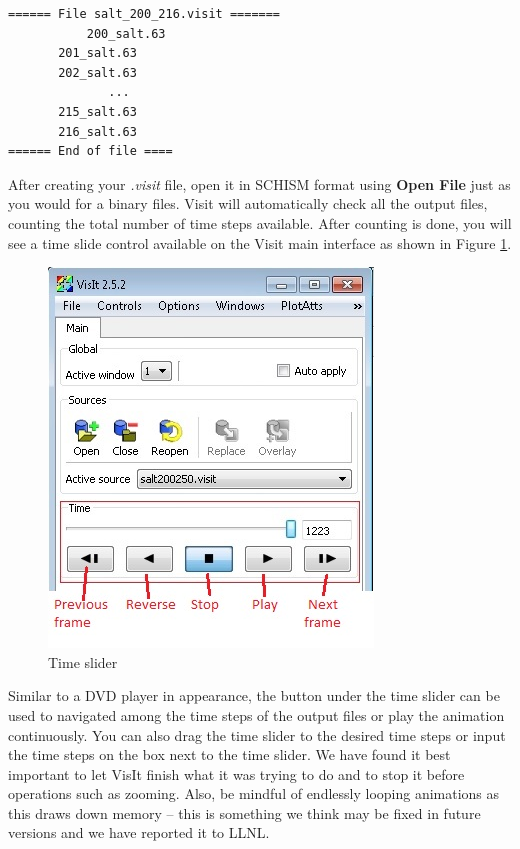 \documentclass[12pt]{report}
\begin{document}
\begin{verbatim}
====== File salt_200_216.visit =======
		   200_salt.63
       201_salt.63
       202_salt.63
			  ... 
       215_salt.63
       216_salt.63
====== End of file ====
\end{verbatim}
		
	
After creating your \emph{.visit} file, open it in SCHISM format using {\bf Open \textrightarrow File} 
just as you would for a binary files. Visit will automatically check all the output files, 
counting the total number of time steps available. After counting is done, you will 
see a time slide control available on the Visit main interface as shown in Figure \ref{figure:timeVCR}.
			
			  \begin{figure}
        \begin{center}
        \includegraphics{timeVCR}
        \caption{Time slider}
        \label{figure:timeVCR}
        \end{center}
        \end{figure} 
				
Similar to a DVD player in appearance, the button under the time slider can be used to navigated among the time steps of the output files or play the animation continuously.  You can also drag the time slider to the 
desired time steps or input the time steps on the box next to the time slider. We have found it
best important to let VisIt finish what it was trying to do and to stop it before operations such as zooming.
Also, be mindful of endlessly looping animations as this draws down memory -- this is something we think
may be fixed in future versions and we have reported it to LLNL.
			
\end{document}
